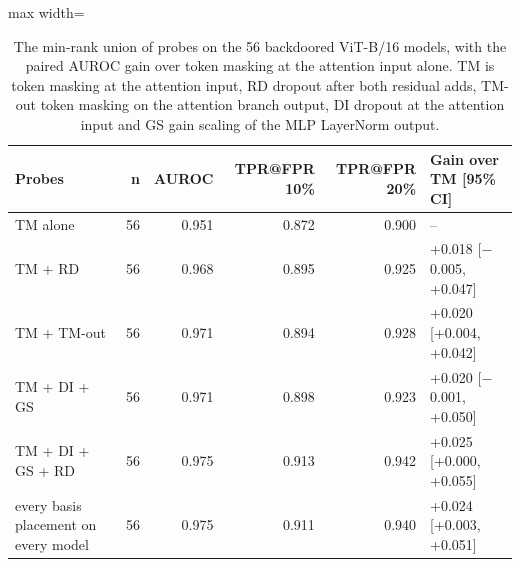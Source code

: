 \begin{table}[htbp]
\centering
\small
\caption{The min-rank union of probes on the 56 backdoored ViT-B/16 models, with the paired AUROC gain over token masking at the attention input alone. TM is token masking at the attention input, RD dropout after both residual adds, TM-out token masking on the attention branch output, DI dropout at the attention input and GS gain scaling of the MLP LayerNorm output.}
\label{tab:probe-union}
\begin{adjustbox}{max width=\textwidth}
\begin{tabular}{lrrrrl}
\toprule
Probes & n & AUROC & TPR@FPR 10\% & TPR@FPR 20\% & Gain over TM [95\% CI] \\
\midrule
TM alone & 56 & 0.951 & 0.872 & 0.900 & -- \\
TM + RD & 56 & 0.968 & 0.895 & 0.925 & +0.018 [$-$0.005, +0.047] \\
TM + TM-out & 56 & 0.971 & 0.894 & 0.928 & +0.020 [+0.004, +0.042] \\
TM + DI + GS & 56 & 0.971 & 0.898 & 0.923 & +0.020 [$-$0.001, +0.050] \\
TM + DI + GS + RD & 56 & 0.975 & 0.913 & 0.942 & +0.025 [+0.000, +0.055] \\
every basis placement on every model & 56 & 0.975 & 0.911 & 0.940 & +0.024 [+0.003, +0.051] \\
\bottomrule
\end{tabular}
\end{adjustbox}
\end{table}
